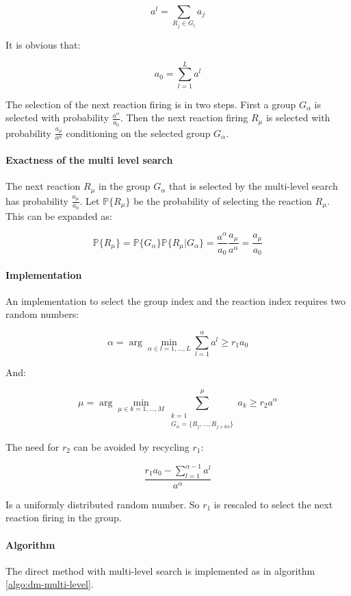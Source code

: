     $$a^l = \sum\limits_{R_j\in G_l}a_j$$

    It is obvious that:

    $$a_0 = \sum\limits_{l=1}^L a^l$$

    The selection of the next reaction firing is in two steps.
    First a group $G_\alpha$ is selected with probability $\frac{a^\alpha}{a_0}$.
    Then the next reaction firing $R_\mu$ is selected with probability $\frac{a_\mu}{a^\alpha}$ conditioning on the selected group $G_\alpha$.

      \paragraph{Exactness of the multi level search}
      The next reaction $R_\mu$ in the group $G_\alpha$ that is selected by the multi-level search has probability $\frac{a_\mu}{a_0}$.
      Let $\mathbb{P}\{R_\mu\}$ be the probability of selecting the reaction $R_\mu$.
      This can be expanded as:

      $$\mathbb{P}\{R_\mu\} = \mathbb{P}\{G_\alpha\}\mathbb{P}\{R_\mu|G_\alpha\} = \frac{a^\alpha}{a_0}\frac{a_\mu}{a^\alpha} = \frac{a_\mu}{a_0}$$

      \paragraph{Implementation}
      An implementation to select the group index and the reaction index requires two random numbers:

      $$\alpha = \arg\min\limits_{\alpha\in l = 1, \dots, L}\sum\limits_{l=1}^\alpha a^l\ge r_1a_0$$

      And:

      $$\mu = \arg\min\limits_{\mu\in k = 1, \dots, M}\sum\limits_{\substack{k=1\\G_\alpha = \{R_j, \dots, R_{j+k\alpha}\}}}^\mu a_k\ge r_2 a^\alpha$$

      The need  for $r_2$ can be avoided by recycling $r_1$:

      $$\frac{r_1 a_0 -\sum\limits_{l=1}^{\alpha-1}a^l}{a^\alpha}$$

      Is a uniformly distributed random number.
      So $r_1$ is rescaled to select the next reaction firing in the group.

      \paragraph{Algorithm}
      The direct method with multi-level search is implemented as in algorithm \ref{algo:dm-multi-level}.

